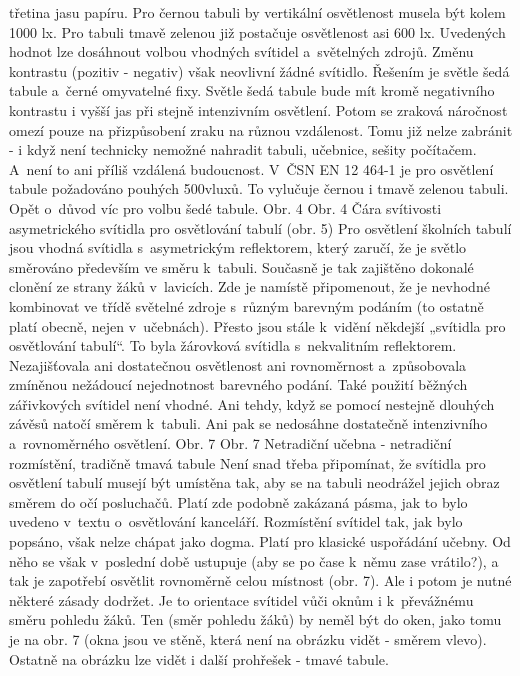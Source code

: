třetina jasu papíru. Pro černou tabuli by vertikální osvětlenost musela být kolem 1000 lx.
Pro tabuli tmavě zelenou již postačuje osvětlenost asi 600 lx. Uvedených hodnot lze dosáhnout
volbou vhodných svítidel a~světelných zdrojů. Změnu kontrastu (pozitiv - negativ) však
neovlivní žádné svítidlo. Řešením je světle šedá tabule a~černé omyvatelné fixy.
Světle šedá tabule bude mít kromě negativního kontrastu i vyšší jas při stejně intenzivním osvětlení.
 Potom se zraková náročnost omezí pouze na přizpůsobení zraku na různou vzdálenost.
 Tomu již nelze zabránit - i když není technicky nemožné nahradit tabuli, učebnice, sešity počítačem.
 A~není to ani příliš vzdálená budoucnost.
\medskip
V~ČSN EN 12 464-1 je pro osvětlení tabule požadováno pouhých 500vluxů. To vylučuje černou i tmavě zelenou tabuli.
 Opět o~důvod víc pro volbu šedé tabule.
Obr. 4
Obr. 4 Čára svítivosti asymetrického svítidla pro osvětlování tabulí (obr. 5)
\medskip
Pro osvětlení školních tabulí jsou vhodná svítidla s~asymetrickým reflektorem, který zaručí,
že je světlo směrováno především ve směru k~tabuli. Současně je tak zajištěno dokonalé clonění
ze strany žáků v~lavicích.
\medskip
Zde je namístě připomenout, že je nevhodné kombinovat ve třídě světelné zdroje s~různým barevným podáním
(to ostatně platí obecně, nejen v~učebnách). Přesto jsou stále k~vidění někdejší „svítidla pro osvětlování tabulí“.
 To byla žárovková svítidla s~nekvalitním reflektorem. Nezajišťovala ani dostatečnou osvětlenost
 ani rovnoměrnost a~způsobovala zmíněnou nežádoucí nejednotnost barevného podání.
\medskip
Také použití běžných zářivkových svítidel není vhodné. Ani tehdy, když se pomocí nestejně
dlouhých závěsů natočí směrem k~tabuli. Ani pak se nedosáhne dostatečně intenzivního a~rovnoměrného osvětlení.
Obr. 7
Obr. 7 Netradiční učebna - netradiční rozmístění, tradičně tmavá tabule
\medskip
Není snad třeba připomínat, že svítidla pro osvětlení tabulí musejí být umístěna tak, aby se
na tabuli neodrážel jejich obraz směrem do očí posluchačů. Platí zde podobně zakázaná pásma,
jak to bylo uvedeno v~textu o~osvětlování kanceláří.
\medskip
Rozmístění svítidel tak, jak bylo popsáno, však nelze chápat jako dogma. Platí pro klasické
uspořádání učebny. Od něho se však v~poslední době ustupuje (aby se po čase k~němu zase vrátilo?),
a tak je zapotřebí osvětlit rovnoměrně celou místnost (obr. 7).
\medskip
Ale i potom je nutné některé zásady dodržet. Je to orientace svítidel vůči oknům i k~převážnému směru
pohledu žáků. Ten (směr pohledu žáků) by neměl být do oken, jako tomu je na obr. 7 (okna jsou ve stěně,
která není na obrázku vidět - směrem vlevo). Ostatně na obrázku lze vidět i další prohřešek - tmavé tabule.